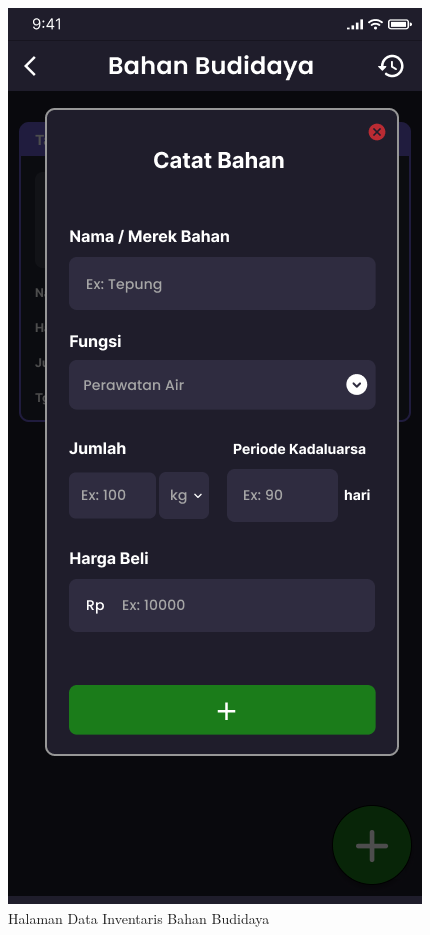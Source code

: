 \begin{enumerate}
\begin{enumerate}
\begin{figure}[H]
			  \caption{Halaman Data Inventaris Bahan Budidaya}
			\endminipage\hfill
			  \includegraphics[width=\linewidth]{gambar/sprint1/mockup_input_materials.png}

\end{figure}
\end{enumerate}
\end{enumerate}

